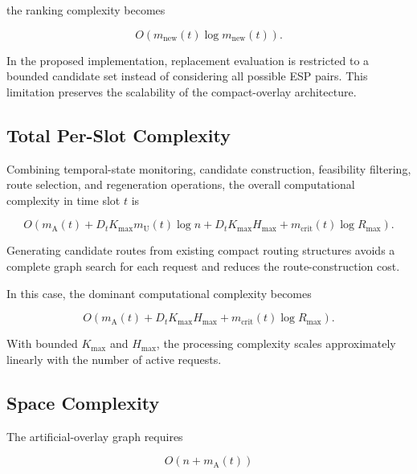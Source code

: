 the ranking complexity becomes

\begin{equation}
    O
    \left(
    m_{\mathrm{new}}(t)
    \log
    m_{\mathrm{new}}(t)
    \right).
\end{equation}

In the proposed implementation, replacement evaluation is restricted to a bounded candidate set instead of considering all possible ESP pairs. This limitation preserves the scalability of the compact-overlay architecture.


\subsection{Total Per-Slot Complexity}

Combining temporal-state monitoring, candidate construction, feasibility filtering, route selection, and regeneration operations, the overall computational complexity in time slot $t$ is

\begin{equation}
    O
    \left(
    m_{\mathrm{A}}(t)
    +
    D_t
    K_{\max}
    m_{\mathrm{U}}(t)
    \log n
    +
    D_t
    K_{\max}
    H_{\max}
    +
    m_{\mathrm{crit}}(t)
    \log R_{\max}
    \right).
\end{equation}

Generating candidate routes from existing compact routing structures avoids a complete graph search for each request and reduces the route-construction cost.

In this case, the dominant computational complexity becomes

\begin{equation}
    O
    \left(
    m_{\mathrm{A}}(t)
    +
    D_t
    K_{\max}
    H_{\max}
    +
    m_{\mathrm{crit}}(t)
    \log R_{\max}
    \right).
\end{equation}

With bounded $K_{\max}$ and $H_{\max}$, the processing complexity scales approximately linearly with the number of active requests.


\subsection{Space Complexity}

The artificial-overlay graph requires

\begin{equation}
    O
    \left(
    n
    +
    m_{\mathrm{A}}(t)
    \right)
\end{equation}

